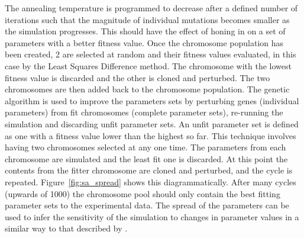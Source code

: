 The annealing temperature is programmed to decrease after a defined number of iterations such that the magnitude of individual mutations becomes smaller as the simulation progresses. This should have the effect of honing in on a set of parameters with a better fitness value.
Once the chromosome population has been created, 2 are selected at random and their fitness values evaluated, in this case by the Least Squares Difference method. The chromosome with the lowest fitness value is discarded and the other is cloned and perturbed. The two chromosomes are then added back to the chromosome population. The genetic algorithm is used to improve the parameters sets by perturbing genes (individual parameters) from fit chromosomes (complete parameter sets), re-running the simulation and discarding unfit parameter sets. An unfit parameter set is defined as one with a fitness value lower than the highest so far. This technique involves having two chromosomes selected at any one time. The parameters from each chromosome are simulated and the least fit one is discarded. At this point the contents from the fitter chromosome are cloned and perturbed, and the cycle is repeated. Figure~\ref{fig:sa_spread} shows this diagrammatically. After many cycles (upwards of 1000) the chromosome pool should 
only
contain the best fitting parameter sets to the experimental data. The spread of the parameters can be used to infer the sensitivity of the simulation to changes in parameter values in a similar way to that described by \citet{Toni2009}.
